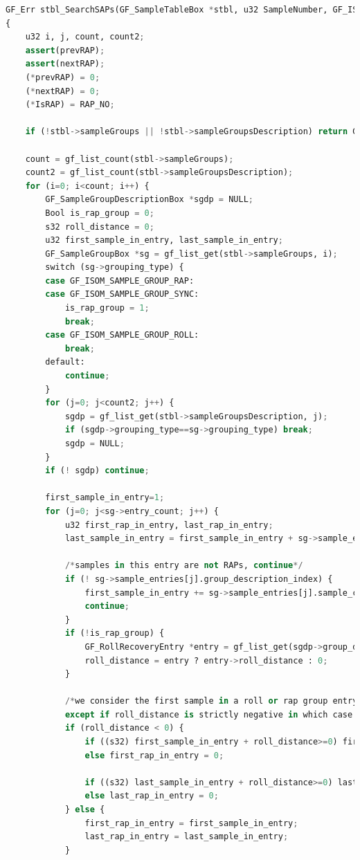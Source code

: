 \documentclass[10pt,UTF8]{ctexart}
\begin{document}
\begin{lstlisting}[language={python}]
GF_Err stbl_SearchSAPs(GF_SampleTableBox *stbl, u32 SampleNumber, GF_ISOSAPType *IsRAP, u32 *prevRAP, u32 *nextRAP)
{
	u32 i, j, count, count2;
	assert(prevRAP);
	assert(nextRAP);
	(*prevRAP) = 0;
	(*nextRAP) = 0;
	(*IsRAP) = RAP_NO;

	if (!stbl->sampleGroups || !stbl->sampleGroupsDescription) return GF_OK;

	count = gf_list_count(stbl->sampleGroups);
	count2 = gf_list_count(stbl->sampleGroupsDescription);
	for (i=0; i<count; i++) {
		GF_SampleGroupDescriptionBox *sgdp = NULL;
		Bool is_rap_group = 0;
		s32 roll_distance = 0;
		u32 first_sample_in_entry, last_sample_in_entry;
		GF_SampleGroupBox *sg = gf_list_get(stbl->sampleGroups, i);
		switch (sg->grouping_type) {
		case GF_ISOM_SAMPLE_GROUP_RAP:
		case GF_ISOM_SAMPLE_GROUP_SYNC:
			is_rap_group = 1;
			break;
		case GF_ISOM_SAMPLE_GROUP_ROLL:
			break;
		default:
			continue;
		}
		for (j=0; j<count2; j++) {
			sgdp = gf_list_get(stbl->sampleGroupsDescription, j);
			if (sgdp->grouping_type==sg->grouping_type) break;
			sgdp = NULL;
		}
		if (! sgdp) continue;

		first_sample_in_entry=1;
		for (j=0; j<sg->entry_count; j++) {
			u32 first_rap_in_entry, last_rap_in_entry;
			last_sample_in_entry = first_sample_in_entry + sg->sample_entries[j].sample_count - 1;

			/*samples in this entry are not RAPs, continue*/
			if (! sg->sample_entries[j].group_description_index) {
				first_sample_in_entry += sg->sample_entries[j].sample_count;
				continue;
			}
			if (!is_rap_group) {
				GF_RollRecoveryEntry *entry = gf_list_get(sgdp->group_descriptions, sg->sample_entries[j].group_description_index - 1);
				roll_distance = entry ? entry->roll_distance : 0;
			}

			/*we consider the first sample in a roll or rap group entry to be the RAP (eg, we have to decode from this sample anyway)
			except if roll_distance is strictly negative in which case we have to rewind our sample numbers from roll_distance*/
			if (roll_distance < 0) {
				if ((s32) first_sample_in_entry + roll_distance>=0) first_rap_in_entry = first_sample_in_entry + roll_distance;
				else first_rap_in_entry = 0;

				if ((s32) last_sample_in_entry + roll_distance>=0) last_rap_in_entry = last_sample_in_entry + roll_distance;
				else last_rap_in_entry = 0;
			} else {
				first_rap_in_entry = first_sample_in_entry;
				last_rap_in_entry = last_sample_in_entry;
			}


\end{lstlisting}
\end{document}
